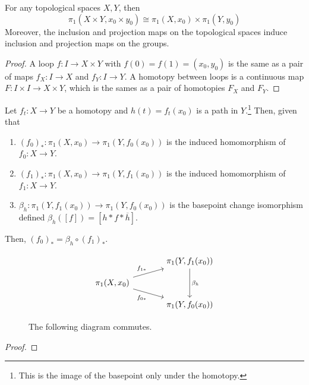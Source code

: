   \begin{theorem}
    \label{thm:direct-products-of-fundamental-groups}
    For any topological spaces $X, Y$, then 
    \begin{equation}
      \pi_1 (X \times Y, x_0 \times y_0) \cong \pi_1 (X, x_0) \times \pi_1 (Y, y_0)
    \end{equation}
    Moreover, the inclusion and projection maps on the topological spaces induce inclusion and projection maps on the groups. 
  \end{theorem}
  \begin{proof}
    A loop $f: I \to X \times Y$  with $f(0) = f(1) = (x_0, y_0)$ is the same as a pair of maps $f_X : I \to X$ and $f_Y : I \to Y$. A homotopy between loops is a continuous map $F: I \times I \to X \times Y$, which is the sames as a pair of homotopies $F_X$ and $F_Y$. 
  \end{proof}

	\begin{theorem}
	  \label{thm:induced-homomorphism-of-homotopy}
		Let $f_t: X \to Y$ be a homotopy and $h(t) = f_t(x_0)$ is a path in $Y$.\footnote{This is the image of the basepoint only under the homotopy.} Then, given that 
		\begin{enumerate}
		  \item $(f_0)_\ast: \pi_1 (X, x_0) \to \pi_1 (Y, f_0(x_0))$ is the induced homomorphism of $f_0: X \to Y$. 
		  \item $(f_1)_\ast: \pi_1 (X, x_0) \to \pi_1 (Y, f_1(x_0))$ is the induced homomorphism of $f_1: X \to Y$. 
			\item $\beta_h: \pi_1 (Y, f_1(x_0)) \to \pi_1 (Y, f_0 (x_0))$ is the basepoint change isomorphism defined $\beta_h ([f]) = [h \ast f \ast \overline{h}]$. 
		\end{enumerate} 
		Then, $(f_0)_\ast = \beta_h \circ (f_1)_\ast$. 

		\begin{figure}[H]
			\centering 
			\begin{equation}
			  \begin{tikzcd}[column sep=large, row sep=small]
			  	& \pi_1(Y,f_1(x_0))
			  		\arrow[dd, "\beta_h"] \\
			  	\pi_1(X,x_0)
			  		\arrow[ur, "f_{1*}"]
			  		\arrow[dr, "f_{0*}"'] & \\
			  	& \pi_1(Y,f_0(x_0))
			  \end{tikzcd}
			\end{equation}
			\caption{The following diagram commutes. } 
			\label{fig:induced_homomorphism_of_homotopy}
		\end{figure}
	\end{theorem}
	\begin{proof}
	  
	\end{proof}

